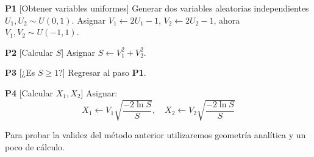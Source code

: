 \begin{algorithm}[H]
\caption{Método polar para desviaciones normales}
\label{alg:desviaciones}
\begin{algorithmic}[1]
\State \textbf{P1} [Obtener variables uniformes]
\State Generar dos variables aleatorias independientes \( U_1, U_2 \sim U(0,1) \).
\State Asignar \( V_1 \gets 2U_1 - 1 \), \( V_2 \gets 2U_2 - 1 \), ahora \( V_1, V_2 \sim U(-1,1) \).

\State \textbf{P2} [Calcular \( S \)]
\State Asignar \( S \gets V_1^2 + V_2^2 \).

\State \textbf{P3} [¿Es \( S \geq 1 \)?]
    \State Regresar al paso \textbf{P1}.
\EndIf

\State \textbf{P4} [Calcular \( X_1, X_2 \)]
\State Asignar:
\[
X_1 \gets V_1 \sqrt{\frac{-2 \ln S}{S}}, \quad X_2 \gets V_2 \sqrt{\frac{-2 \ln S}{S}}
\]

\end{algorithmic}
\end{algorithm}
Para probar la validez del método anterior utilizaremos geometría analítica y un poco de cálculo.
